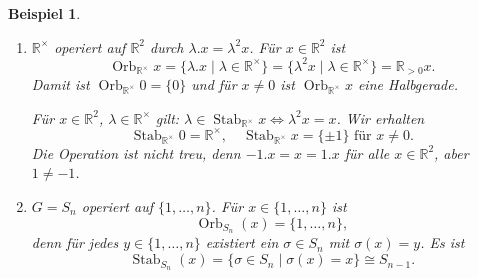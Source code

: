 \documentclass[a4paper, twoside, 11pt, ngerman]{report}
\newcommand{\RR}{\mathds R}
\DeclareMathOperator{\Orb}{Orb}
\DeclareMathOperator{\Stab}{Stab}
\theoremstyle{definistyle}
\newtheorem{bsp}[satz]{Beispiel}
\theoremstyle{remark}
\begin{document}
\begin{bsp}\label{bsp:orbit_stabilisator_beispiele}
\begin{enumerate}[label=(\alph*)]
    \item $\RR^{\times}$ operiert auf $\RR^2$ durch $\lambda. x = \lambda^2 x$. Für $x \in \RR^2$ ist
    \[
    \Orb_{\RR^{\times}} x = \{ \lambda. x \mid \lambda \in \RR^{\times} \} = \{ \lambda^2 x \mid \lambda \in \RR^{\times} \} = \RR_{>0} x.
    \]
    Damit ist $\Orb_{\RR^{\times}} 0 = \{0\}$ und für $x \neq 0$ ist $\Orb_{\RR^{\times}} x$ eine Halbgerade.

\begin{center}
\end{center}
    Für $x \in \RR^2$, $\lambda \in \RR^{\times}$ gilt: $\lambda \in \Stab_{\RR^{\times}} x \iff \lambda^2 x = x$. Wir erhalten
    \[
    \Stab_{\RR^{\times}} 0 = \RR^{\times}, \quad \Stab_{\RR^{\times}} x = \{\pm 1\} \text{ für } x \neq 0.
    \]
    Die Operation ist nicht treu, denn $-1.x = x = 1.x$ für alle $x \in \RR^2$, aber $1 \neq -1$.

    \item $G = S_n$ operiert auf $\{1, \dots, n\}$. Für $x \in \{1, \dots, n\}$ ist \[\Orb_{S_n}(x) = \{1, \dots, n\},\] denn für jedes $y \in \{1, \dots, n\}$ existiert ein $\sigma \in S_n$ mit $\sigma(x) = y$. Es ist \[\Stab_{S_n}(x) = \{\sigma \in S_n \mid \sigma(x) = x\} \cong S_{n-1}.\]


\end{enumerate}
\end{bsp}
\end{document}
